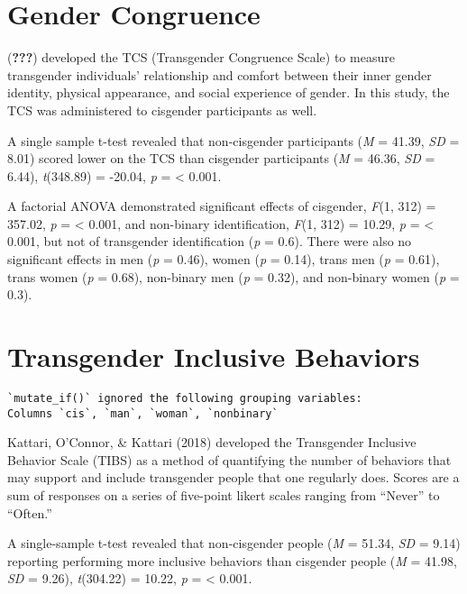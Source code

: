 \documentclass[12pt,twoside]{reedthesis}
\begin{document}
\hypertarget{gender-congruence}{%
\section{Gender Congruence}\label{gender-congruence}}

({\textbf{???}}) developed the TCS (Transgender Congruence Scale) to measure transgender individuals' relationship and comfort between their inner gender identity, physical appearance, and social experience of gender. In this study, the TCS was administered to cisgender participants as well.

A single sample t-test revealed that non-cisgender participants (\emph{M} = 41.39, \emph{SD} = 8.01) scored lower on the TCS than cisgender participants (\emph{M} = 46.36, \emph{SD} = 6.44), \emph{t}(348.89) = -20.04, \emph{p} = \textless{} 0.001.

A factorial ANOVA demonstrated significant effects of cisgender, \emph{F}(1, 312) = 357.02, \emph{p} = \textless{} 0.001,
and non-binary identification, \emph{F}(1, 312) = 10.29, \emph{p} = \textless{} 0.001,
but not of transgender identification (\emph{p} = 0.6).
There were also no significant effects in men (\emph{p} = 0.46), women (\emph{p} = 0.14), trans men (\emph{p} = 0.61), trans women (\emph{p} = 0.68), non-binary men (\emph{p} = 0.32), and non-binary women (\emph{p} = 0.3).

\hypertarget{transgender-inclusive-behaviors}{%
\section{Transgender Inclusive Behaviors}\label{transgender-inclusive-behaviors}}
\begin{verbatim}
`mutate_if()` ignored the following grouping variables:
Columns `cis`, `man`, `woman`, `nonbinary`
\end{verbatim}
Kattari, O'Connor, \& Kattari (2018) developed the Transgender Inclusive Behavior Scale (TIBS) as a method of quantifying the number of behaviors that may support and include transgender people that one regularly does. Scores are a sum of responses on a series of five-point likert scales ranging from ``Never'' to ``Often.''

A single-sample t-test revealed that non-cisgender people (\emph{M} = 51.34, \emph{SD} = 9.14) reporting performing more inclusive behaviors than cisgender people (\emph{M} = 41.98, \emph{SD} = 9.26), \emph{t}(304.22) = 10.22, \emph{p} = \textless{} 0.001.
\end{document}
